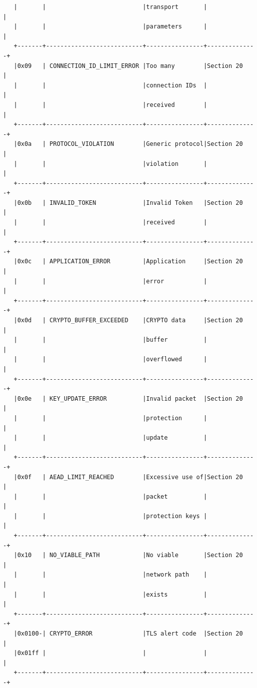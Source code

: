 \documentclass{article}
\begin{document}
\begin{verbatim}
   |       |                           |transport       |              |
   |       |                           |parameters      |              |
   +-------+---------------------------+----------------+--------------+
   |0x09   | CONNECTION_ID_LIMIT_ERROR |Too many        |Section 20    |
   |       |                           |connection IDs  |              |
   |       |                           |received        |              |
   +-------+---------------------------+----------------+--------------+
   |0x0a   | PROTOCOL_VIOLATION        |Generic protocol|Section 20    |
   |       |                           |violation       |              |
   +-------+---------------------------+----------------+--------------+
   |0x0b   | INVALID_TOKEN             |Invalid Token   |Section 20    |
   |       |                           |received        |              |
   +-------+---------------------------+----------------+--------------+
   |0x0c   | APPLICATION_ERROR         |Application     |Section 20    |
   |       |                           |error           |              |
   +-------+---------------------------+----------------+--------------+
   |0x0d   | CRYPTO_BUFFER_EXCEEDED    |CRYPTO data     |Section 20    |
   |       |                           |buffer          |              |
   |       |                           |overflowed      |              |
   +-------+---------------------------+----------------+--------------+
   |0x0e   | KEY_UPDATE_ERROR          |Invalid packet  |Section 20    |
   |       |                           |protection      |              |
   |       |                           |update          |              |
   +-------+---------------------------+----------------+--------------+
   |0x0f   | AEAD_LIMIT_REACHED        |Excessive use of|Section 20    |
   |       |                           |packet          |              |
   |       |                           |protection keys |              |
   +-------+---------------------------+----------------+--------------+
   |0x10   | NO_VIABLE_PATH            |No viable       |Section 20    |
   |       |                           |network path    |              |
   |       |                           |exists          |              |
   +-------+---------------------------+----------------+--------------+
   |0x0100-| CRYPTO_ERROR              |TLS alert code  |Section 20    |
   |0x01ff |                           |                |              |
   +-------+---------------------------+----------------+--------------+
\end{verbatim}
\end{document}
